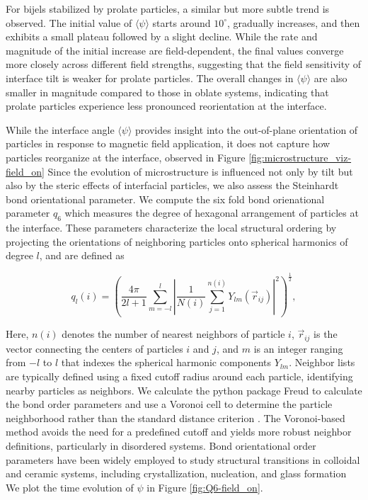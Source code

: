 For bijels stabilized by prolate particles, a similar but more subtle trend is observed. The initial value of \(\langle \psi \rangle\) starts around \(10^\circ\), 
gradually increases, and then exhibits a small plateau followed by a slight decline. While the rate and magnitude of the initial increase are field-dependent, 
the final values converge more closely across different field strengths, suggesting that the field sensitivity of interface tilt is weaker for prolate particles. 
The overall changes in \(\langle \psi \rangle\) are also smaller in magnitude compared to those in oblate systems, indicating that prolate particles experience 
less pronounced reorientation at the interface.

While the interface angle \(\langle \psi \rangle\) provides insight into the out-of-plane orientation of particles in response to magnetic field application, 
it does not capture how particles reorganize at the interface, observed in Figure \ref{fig:microstructure_viz-field_on} Since the evolution of microstructure is 
influenced not only by tilt but also by the steric effects of interfacial particles, we also assess the Steinhardt bond orientational parameter. 
We compute the six fold bond orienational parameter $q_6$ which measures the degree of hexagonal arrangement of particles at the interface.
\cite{steinhardt_bond-orientational_1983, lechner_accurate_2008, mickel_shortcomings_2013} These parameters characterize the local structural ordering by projecting 
the orientations of neighboring particles onto spherical harmonics of degree \(l\), and are defined as

\begin{equation}
q_l(i) = \left( \frac{4\pi}{2l+1} \sum_{m=-l}^{l} \left| \frac{1}{N(i)} \sum_{j=1}^{n(i)} Y_{lm}(\vec{r}_{ij}) \right|^2 \right)^{\frac{1}{2}} ,
\end{equation} 

Here, \(n(i)\) denotes the number of nearest neighbors of particle \(i\), \(\vec{r}_{ij}\) is the vector connecting the centers of particles \(i\) and \(j\), and 
\(m\) is an integer ranging from \(-l\) to \(l\) that indexes the spherical harmonic components \(Y_{lm}\). Neighbor lists are typically defined using a fixed cutoff 
radius around each particle, identifying nearby particles as neighbors. We calculate the python package Freud to calculate the bond order parameters and use a Voronoi 
cell to determine the particle neighborhood rather than the standard distance criterion \cite{ramasubramani_freud_2020,mickel_shortcomings_2013}. The Voronoi-based 
method avoids the need for a predefined cutoff and yields more robust neighbor definitions, particularly in disordered systems. Bond orientational order parameters 
have been widely employed to study structural transitions in colloidal and ceramic systems, including crystallization, nucleation, and glass formation 
\cite{vagberg_glassiness_2011, besseling_three-dimensional_2007, schall_structural_2007, ozawa_jamming_2012} We plot the time evolution of $\psi$ in Figure 
\ref{fig:Q6-field_on}.

